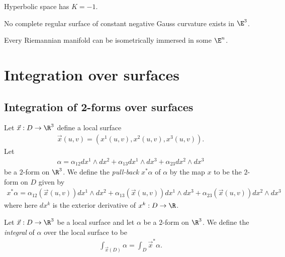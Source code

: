 \documentclass{article}
\begin{document}
\begin{theorem}[Notes 13.2]
	Hyperbolic space has $K=-1$.
\end{theorem}

\begin{theorem}[Hilbert]
	No complete regular surface of constant negative Gauss curvature exists in $\E^3$.
\end{theorem}

\begin{theorem}[Nash]
	Every Riemannian manifold can be isometrically immersed in some $\E^n$.
\end{theorem}

\section{Integration over surfaces}

\subsection{Integration of 2-forms over surfaces}

\begin{definition}
	Let $\vec x:D\to\R^3$ define a local surface
	\begin{align*}
		\vec x(u,v)=(x^1(u,v), x^2(u,v), x^3(u,v)).
	\end{align*}
	Let
	\begin{align*}
		\alpha = \alpha_{12}dx^1\wedge dx^2 + \alpha_{13}dx^1\wedge dx^3 + \alpha_{23}dx^2\wedge dx^3
	\end{align*}
	be a $2$-form on $\R^3$. We define the \emph{pull-back} $x^*\alpha$ of $\alpha$ by the map $x$
	to be the $2$-form on $D$ given by
	\begin{align*}
		x^*\alpha = \alpha_{12}(\vec x(u,v))dx^1\wedge dx^2+ \alpha_{13}(\vec x(u,v))dx^1\wedge dx^3 + \alpha_{23}(\vec x(u,v))dx^2\wedge dx^3
	\end{align*}
	where here $dx^k$ is the exterior derivative of $x^k:D\to\R$.
\end{definition}

\begin{definition}
	Let $\vec x:D\to\R^3$ be a local surface and let $\alpha$ be a $2$-form on $\R^3$. We define
	the \emph{integral} of $\alpha$ over the local surface to be
	\begin{align*}
		\int_{\vec x(D)} \alpha = \int_D \vec x^*\alpha.
	\end{align*}
\end{definition}
\end{document}
